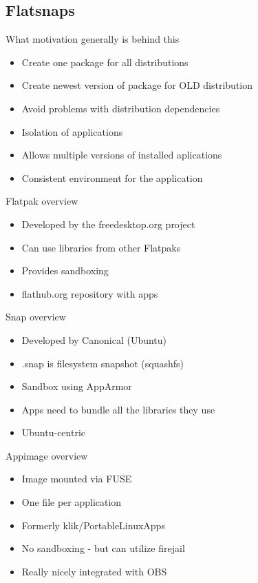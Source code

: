 \documentclass{beamer}
\begin{document}
\subsection{Flatsnaps}

\begin{frame}[t]{What motivation generally is behind this}
	\begin{itemize}
	\item Create one package for all distributions
	\item Create newest version of package for OLD distribution
	\item Avoid problems with distribution dependencies
	\item Isolation of applications
	\item Allows multiple versions of installed aplications
	\item Consistent environment for the application
	\end{itemize}
\end{frame}

\begin{frame}[t]{Flatpak overview}
	\begin{itemize}
	\item Developed by the freedesktop.org project
	\item Can use libraries from other Flatpaks
	\item Provides sandboxing
	\item flathub.org repository with apps
	\end{itemize}
\end{frame}

\begin{frame}[t]{Snap overview}
	\begin{itemize}
	\item Developed by Canonical (Ubuntu)
	\item .snap is filesystem snapshot (squashfs)
	\item Sandbox using AppArmor
	\item Apps need to bundle all the libraries they use
	\item Ubuntu-centric
	\end{itemize}
\end{frame}

\begin{frame}[t]{Appimage overview}
	\begin{itemize}
	\item Image mounted via FUSE
	\item One file per application
	\item Formerly klik/PortableLinuxApps
	\item No sandboxing - but can utilize firejail
	\item Really nicely integrated with OBS
	\end{itemize}
\end{frame}
\end{document}
